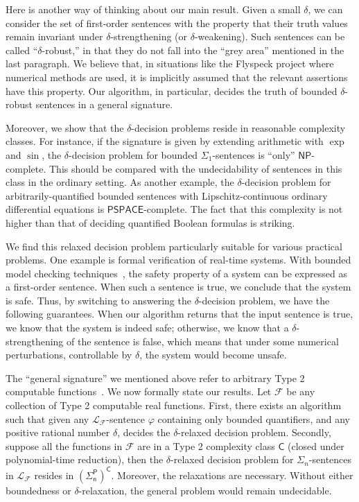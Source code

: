 \documentclass[conference]{IEEEtran}
\begin{document}
Here is another way of thinking about our main result. Given a small $\delta$, we can consider the set of first-order sentences with the property that their truth values remain invariant under $\delta$-strengthening (or $\delta$-weakening). Such sentences can be called ``$\delta$-robust,'' in that they do not fall into the ``grey area'' mentioned in the last paragraph. We believe that, in situations like the Flyspeck project where numerical methods are used, it is implicitly assumed that the relevant assertions have this property. Our algorithm, in particular, decides the truth of bounded $\delta$-robust sentences in a general signature. 

Moreover, we show that the $\delta$-decision problems reside in reasonable complexity classes. For instance, if the signature is given by extending arithmetic with $\exp$ and $\sin$, the $\delta$-decision problem for bounded $\Sigma_1$-sentences is ``only'' $\mathsf{NP}$-complete. This should be compared with the undecidability of sentences in this class in the ordinary setting. As another example, the $\delta$-decision problem for arbitrarily-quantified bounded sentences with Lipschitz-continuous ordinary differential equations is $\mathsf{PSPACE}$-complete. The fact that this complexity is not higher than that of deciding quantified Boolean formulas is striking. 

We find this relaxed decision problem particularly suitable for various practical problems. One example is formal verification of real-time systems. With bounded model checking techniques~\cite{DBLP:journals/fmsd/ClarkeBRZ01}, the safety property of a system can be expressed as a first-order sentence. When such a sentence is true, we conclude that the system is safe. Thus, by switching to answering the $\delta$-decision problem, we have the following guarantees. When our algorithm returns that the input sentence is true, we know that the system is indeed safe; otherwise, we know that a $\delta$-strengthening of the sentence is false, which means that under some numerical perturbations, controllable by $\delta$, the system would become unsafe. 

The ``general signature'' we mentioned above refer to arbitrary Type 2 computable functions~\cite{CAbook}. We now formally state our results. Let $\mathcal{F}$ be any collection of Type 2 computable real functions. First, there exists an algorithm such that given any $\mathcal{L}_{\mathcal{F}}$-sentence $\varphi$ containing only bounded quantifiers, and any positive rational number $\delta$, decides the $\delta$-relaxed decision problem. Secondly, suppose all the functions in $\mathcal{F}$ are in a Type 2 complexity class $\mathsf{C}$ (closed under polynomial-time reduction), then the $\delta$-relaxed decision problem for $\Sigma_n$-sentences in $\mathcal{L}_{\mathcal{F}}$ resides in $\mathsf{(\Sigma_n^P)^C}$. Moreover, the relaxations are necessary. Without either boundedness or $\delta$-relaxation, the general problem would remain undecidable. 
\end{document}
